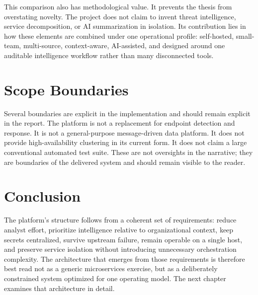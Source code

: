 This comparison also has methodological value. It prevents the thesis from overstating novelty. The project does not claim to invent threat intelligence, service decomposition, or AI summarization in isolation. Its contribution lies in how these elements are combined under one operational profile: self-hosted, small-team, multi-source, context-aware, AI-assisted, and designed around one auditable intelligence workflow rather than many disconnected tools.

\section{Scope Boundaries}
Several boundaries are explicit in the implementation and should remain explicit in the report. The platform is not a replacement for endpoint detection and response. It is not a general-purpose message-driven data platform. It does not provide high-availability clustering in its current form. It does not claim a large conventional automated test suite. These are not oversights in the narrative; they are boundaries of the delivered system and should remain visible to the reader.

\section*{Conclusion}
The platform's structure follows from a coherent set of requirements: reduce analyst effort, prioritize intelligence relative to organizational context, keep secrets centralized, survive upstream failure, remain operable on a single host, and preserve service isolation without introducing unnecessary orchestration complexity. The architecture that emerges from those requirements is therefore best read not as a generic microservices exercise, but as a deliberately constrained system optimized for one operating model. The next chapter examines that architecture in detail.
